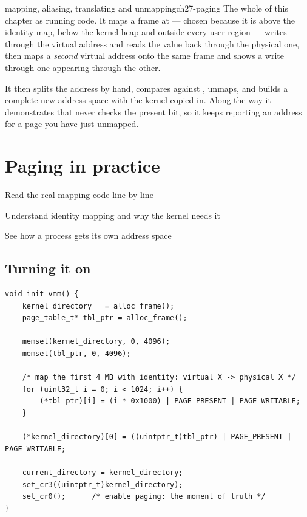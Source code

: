 \begin{recipe}{mapping, aliasing, translating and unmapping}{ch27-paging}
The whole of this chapter as running code. It maps a frame at  --- chosen because it
is above the identity map, below the kernel heap and outside every user region --- writes through
the virtual address and reads the value back through the physical one, then maps a \emph{second}
virtual address onto the same frame and shows a write through one appearing through the other.

It then splits the address by hand, compares against , unmaps, and
builds a complete new address space with the kernel copied in. Along the way it demonstrates that
 never checks the present bit, so it keeps reporting an address for a
page you have just unmapped.
\end{recipe}



\chapter{Paging in practice}

\begin{goals}
  \item Read the real mapping code line by line
  \item Understand identity mapping and why the kernel needs it
  \item See how a process gets its own address space
\end{goals}

\section{Turning it on}

\begin{lstlisting}[style=c]
void init_vmm() {
    kernel_directory   = alloc_frame();
    page_table_t* tbl_ptr = alloc_frame();

    memset(kernel_directory, 0, 4096);
    memset(tbl_ptr, 0, 4096);

    /* map the first 4 MB with identity: virtual X -> physical X */
    for (uint32_t i = 0; i < 1024; i++) {
        (*tbl_ptr)[i] = (i * 0x1000) | PAGE_PRESENT | PAGE_WRITABLE;
    }

    (*kernel_directory)[0] = ((uintptr_t)tbl_ptr) | PAGE_PRESENT | PAGE_WRITABLE;

    current_directory = kernel_directory;
    set_cr3((uintptr_t)kernel_directory);
    set_cr0();      /* enable paging: the moment of truth */
}
\end{lstlisting}

